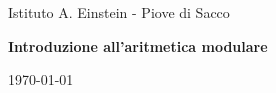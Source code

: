 \begin{titlepage}
    \begin{center}
        \vspace*{1cm}
        
        \LARGE
        Istituto A. Einstein - Piove di Sacco
        
        \vspace{1.5cm}
        
        \Huge
        \textbf{Introduzione all'aritmetica modulare}
        
        \vspace{1.5cm}
                    
        \LARGE
        \today
            
        \vfill
        
    \end{center}
\end{titlepage}